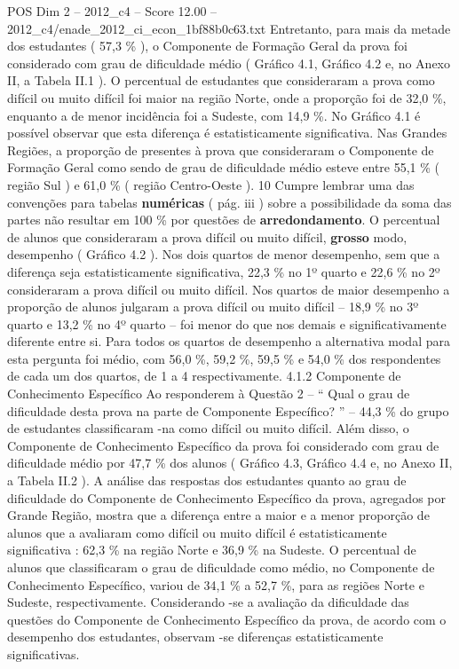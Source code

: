 \begin{textsample}{POS Dim 2 – 2012\_c4 – Score 12.00 – 2012\_c4/enade\_2012\_ci\_econ\_1bf88b0c63.txt}
Entretanto, para mais da metade dos estudantes ( 57,3 \% ), o Componente de Formação Geral da prova foi considerado com grau de dificuldade médio ( Gráfico 4.1, Gráfico 4.2 e, no Anexo II, a Tabela II.1 ).
O percentual de estudantes que consideraram a prova como difícil ou muito difícil foi maior na região Norte, onde a proporção foi de 32,0 \%, enquanto a de menor incidência foi a Sudeste, com 14,9 \%.
No Gráfico 4.1 é possível observar que esta diferença é estatisticamente significativa.
Nas Grandes Regiões, a proporção de presentes à prova que consideraram o Componente de Formação Geral como sendo de grau de dificuldade médio esteve entre 55,1 \% ( região Sul ) e 61,0 \% ( região Centro-Oeste ). 10 Cumpre lembrar uma das convenções para tabelas \textbf{numéricas} ( pág. iii ) sobre a possibilidade da soma das partes não resultar em 100 \% por questões de \textbf{arredondamento}.
O percentual de alunos que consideraram a prova difícil ou muito difícil, \textbf{grosso} modo, desempenho ( Gráfico 4.2 ).
Nos dois quartos de menor desempenho, sem que a diferença seja estatisticamente significativa, 22,3 \% no 1º quarto e 22,6 \% no 2º consideraram a prova difícil ou muito difícil.
Nos quartos de maior desempenho a proporção de alunos julgaram a prova difícil ou muito difícil – 18,9 \% no 3º quarto e 13,2 \% no 4º quarto – foi menor do que nos demais e significativamente diferente entre si.
Para todos os quartos de desempenho a alternativa modal para esta pergunta foi médio, com 56,0 \%, 59,2 \%, 59,5 \% e 54,0 \% dos respondentes de cada um dos quartos, de 1 a 4 respectivamente. 4.1.2 Componente de Conhecimento Específico Ao responderem à Questão 2 – “ Qual o grau de dificuldade desta prova na parte de Componente Específico? ” – 44,3 \% do grupo de estudantes classificaram -na como difícil ou muito difícil.
Além disso, o Componente de Conhecimento Específico da prova foi considerado com grau de dificuldade médio por 47,7 \% dos alunos ( Gráfico 4.3, Gráfico 4.4 e, no Anexo II, a Tabela II.2 ).
A análise das respostas dos estudantes quanto ao grau de dificuldade do Componente de Conhecimento Específico da prova, agregados por Grande Região, mostra que a diferença entre a maior e a menor proporção de alunos que a avaliaram como difícil ou muito difícil é estatisticamente significativa : 62,3 \% na região Norte e 36,9 \% na Sudeste.
O percentual de alunos que classificaram o grau de dificuldade como médio, no Componente de Conhecimento Específico, variou de 34,1 \% a 52,7 \%, para as regiões Norte e Sudeste, respectivamente.
Considerando -se a avaliação da dificuldade das questões do Componente de Conhecimento Específico da prova, de acordo com o desempenho dos estudantes, observam -se diferenças estatisticamente significativas.

\end{textsample}
